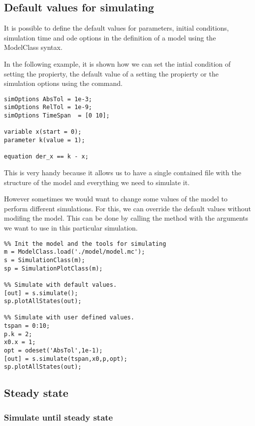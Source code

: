 \documentclass[11pt]{article}
\begin{document}
\subsection{Default values for simulating}

It is possible to define the default values for parameters, initial conditions, simulation time and ode options in the definition of a model using the ModelClass syntax.

In the following example, it is shown how we can set the intial condition of  setting the  propierty, the default value of a  setting the  propierty or the simulation options using the  command.

\begin{lstlisting}
simOptions AbsTol = 1e-3;
simOptions RelTol = 1e-9;
simOptions TimeSpan  = [0 10];

variable x(start = 0);
parameter k(value = 1);

equation der_x == k - x;
\end{lstlisting}

This is very handy because it allows us to have a single contained file with the structure of the model and everything we need to simulate it.

However sometimes we would want to change some values of the model to perform different simulations.
For this, we can override the default values without modifing the model. This can be done by calling the  method with the arguments we want to use in this particular simulation.

\begin{lstlisting}
%% Init the model and the tools for simulating
m = ModelClass.load('./model/model.mc');
s = SimulationClass(m);
sp = SimulationPlotClass(m);

%% Simulate with default values.
[out] = s.simulate();
sp.plotAllStates(out);

%% Simulate with user defined values.
tspan = 0:10;
p.k = 2;
x0.x = 1;
opt = odeset('AbsTol',1e-1);
[out] = s.simulate(tspan,x0,p,opt);
sp.plotAllStates(out);
\end{lstlisting}

\subsection{Steady state}

\subsubsection{Simulate until steady state}
\end{document}
